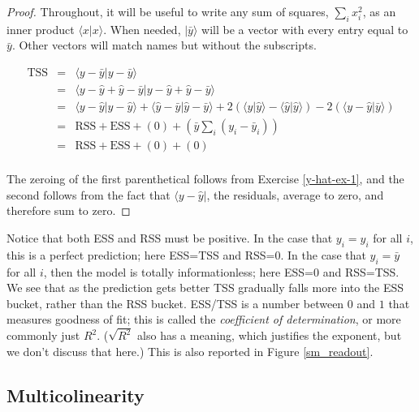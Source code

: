 \documentclass{amsbook}
\begin{document}
\begin{proof}
Throughout, it will be useful to write any sum of squares, $\sum_i x_i^2$, as an inner product $\langle x|x\rangle$.  When needed, $|\bar y\rangle$ will be a vector with every entry equal to $\bar y$.  Other vectors will match names but without the subscripts.

$$
\begin{array}{rcl}
\text{TSS} &=& \langle y-\bar y|y-\bar y\rangle \\
&=& \langle y-\hat y+\hat y -\bar y|y-\hat y+\hat y -\bar y\rangle \\
&=& \langle y-\hat y|y-\hat y\rangle + \langle \hat y - \bar y|\hat y-\bar y\rangle + 2\left(\langle y|\hat y\rangle -\langle\hat y|\hat y\rangle\right) -2\left(\langle y-\hat y|\bar y\rangle\right) \\
&=& \text{RSS} + \text{ESS} + (0) + \left(\bar y\sum_i\left(y_i-\bar y_i\right)\right) \\
&=& \text{RSS} + \text{ESS} + (0) + (0) \\
\end{array}
$$

The zeroing of the first parenthetical follows from Exercise \ref{y-hat-ex-1}, and the second follows from the fact that $\langle y-\hat y|$, the residuals, average to zero, and therefore sum to zero.
\end{proof}

Notice that both ESS and RSS must be positive.  In the case that $y_i=\hat y_i$ for all $i$, this is a perfect prediction; here ESS=TSS and RSS=$0$.  In the case that $y_i=\bar y$ for all $i$, then the model is totally informationless; here ESS=$0$ and RSS=TSS.  We see that as the prediction gets better TSS gradually falls more into the ESS bucket, rather than the RSS bucket.  ESS/TSS is a number between $0$ and $1$ that measures goodness of fit; this is called the {\em coefficient of determination}, or more commonly just $R^2$.  ($\sqrt{R^2}$ also has a meaning, which justifies the exponent, but we don't discuss that here.)  This is also reported in Figure \ref{sm_readout}.

\subsection{Multicolinearity}
\end{document}
